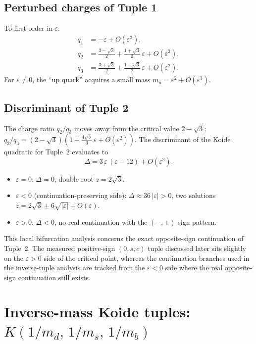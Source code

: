 \documentclass[11pt]{article}
\begin{document}
\subsection{Perturbed charges of Tuple 1}

To first order in $\varepsilon$:
\begin{align}
  q_1 &= -\varepsilon + O(\varepsilon^2), \\
  q_2 &= \tfrac{3-\sqrt3}{2} + \tfrac{1+\sqrt3}{2}\,\varepsilon + O(\varepsilon^2), \\
  q_3 &= \tfrac{3+\sqrt3}{2} + \tfrac{1-\sqrt3}{2}\,\varepsilon + O(\varepsilon^2).
\end{align}
For $\varepsilon\neq 0$, the ``up quark'' acquires a
small mass $m_u = \varepsilon^2 + O(\varepsilon^3)$.

\subsection{Discriminant of Tuple 2}

The charge ratio $q_2/q_3$ moves away from the critical value $2-\sqrt{3}$:
$q_2/q_3 = (2-\sqrt3)\!\left(1 + \frac{4\sqrt3}{3}\,\varepsilon + O(\varepsilon^2)\right)$.
The discriminant of the Koide quadratic for Tuple~2 evaluates to
\[
  \Delta = 3\,\varepsilon\,(\varepsilon - 12) + O(\varepsilon^3).
\]
\begin{itemize}
  \item $\varepsilon = 0$: $\Delta = 0$, double root $z = 2\sqrt{3}$.
  \item $\varepsilon < 0$ (continuation-preserving side):
    $\Delta \approx 36\,|\varepsilon| > 0$, two solutions
    $z = 2\sqrt{3} \pm 6\sqrt{|\varepsilon|} + O(\varepsilon)$.
  \item $\varepsilon > 0$: $\Delta < 0$,
    no real continuation with the $(-,+)$ sign pattern.
\end{itemize}

This local bifurcation analysis concerns the exact opposite-sign continuation
of Tuple~2.  The measured positive-sign $(0,s,c)$ tuple discussed later sits
slightly on the $\varepsilon>0$ side of the critical point, whereas the
continuation branches used in the inverse-tuple analysis are tracked from the
$\varepsilon<0$ side where the real opposite-sign continuation still exists.

\section{Inverse-mass Koide tuples: $K(1/m_d,\,1/m_s,\,1/m_b)$}
\end{document}
